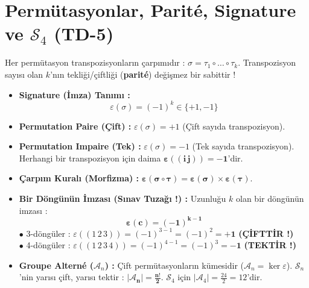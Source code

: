 \documentclass[11pt,a4paper]{article}
\begin{document}
\vspace{0.5cm}

\section{Permütasyonlar, Parité, Signature ve $\mathcal{S}_4$ (TD-5)}

\begin{tcolorbox}[colback=teal!5!white,colframe=teal!80!black,title=Hocanın Tahtada Anlattığı : Parité et Signature ($\varepsilon$)]
Her permütasyon transpozisyonların çarpımıdır : $\sigma = \tau_1 \circ \dots \circ \tau_k$.  
Transpozisyon sayısı olan $k$'nın tekliği/çiftliği (\textbf{parité}) değişmez bir sabittir !
\begin{itemize}
    \item \textbf{Signature (İmza) Tanımı :} 
    \[ \varepsilon(\sigma) = (-1)^k \in \{+1, -1\} \]
    \item \textbf{Permutation Paire (Çift) :} $\varepsilon(\sigma) = +1$ (Çift sayıda transpozisyon).
    \item \textbf{Permutation Impaire (Tek) :} $\varepsilon(\sigma) = -1$ (Tek sayıda transpozisyon). Herhangi bir transpozisyon için daima $\mathbf{\varepsilon((i\,j)) = -1}$'dir.
    \item \textbf{Çarpım Kuralı (Morfizma) :} $\mathbf{\varepsilon(\sigma \circ \tau) = \varepsilon(\sigma) \times \varepsilon(\tau)}$.
    \item \textbf{Bir Döngünün İmzası (Sınav Tuzağı !) :} Uzunluğu $k$ olan bir döngünün imzası :
    \[ \mathbf{\varepsilon(c) = (-1)^{k-1}} \]
    $\bullet$ 3-döngüler : $\varepsilon((1\,2\,3)) = (-1)^{3-1} = (-1)^2 = \mathbf{+1}$ \textbf{(ÇİFTTİR !)} \\
    $\bullet$ 4-döngüler : $\varepsilon((1\,2\,3\,4)) = (-1)^{4-1} = (-1)^3 = \mathbf{-1}$ \textbf{(TEKTİR !)}
    \item \textbf{Groupe Alterné ($\mathcal{A}_n$) :} Çift permütasyonların kümesidir ($\mathcal{A}_n = \ker \varepsilon$).  
    $\mathcal{S}_n$'nin yarısı çift, yarısı tektir : $\mathbf{|\mathcal{A}_n| = \frac{n!}{2}}$. $\mathcal{S}_4$ için $|\mathcal{A}_4| = \frac{24}{2} = 12$'dir.
\end{itemize}
\end{tcolorbox}
\end{document}
